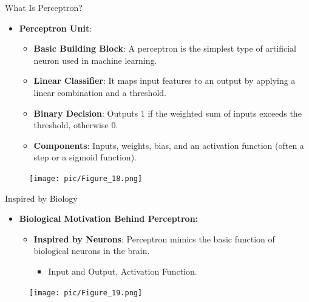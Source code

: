 \documentclass[serif, aspectratio=169]{beamer}
\begin{document}
\begin{frame}{What Is Perceptron?}
    \begin{itemize}
        \item \textbf{Perceptron Unit}:
        \medskip
        \begin{itemize}\itemsep1em
        \item \justifying \textbf{Basic Building Block}:
        A perceptron is the simplest type of artificial neuron used in machine learning.
        \item \justifying \textbf{Linear Classifier}:
        It maps input features to an output by applying a linear combination and a threshold.
        \item \justifying \textbf{Binary Decision}:
        Outputs 1 if the weighted sum of inputs exceeds the threshold, otherwise 0.
        \item \justifying \textbf{Components}:
        Inputs, weights, bias, and an activation function (often a step or a sigmoid function).
        \end{itemize}
    \end{itemize}
    \endminipage
    \hfill
    \begin{figure}
        \centering
        \texttt{[image: pic/Figure\_18.png]}
    \end{figure}
    \endminipage
\end{frame}


\begin{frame}{Inspired by Biology}
    \begin{itemize}
        \item \textbf{Biological Motivation Behind Perceptron:}
        \medskip
        \begin{itemize}\itemsep1em
            \item \justifying \textbf{Inspired by Neurons}:
            Perceptron mimics the basic function of biological neurons in the brain.
            \begin{itemize}
                \item \justifying Input and Output, Activation Function.
            \end{itemize}
        \end{itemize}
    \end{itemize}
    \begin{figure}
        \centering
        \texttt{[image: pic/Figure\_19.png]}
    \end{figure}
\end{frame}
\end{document}
